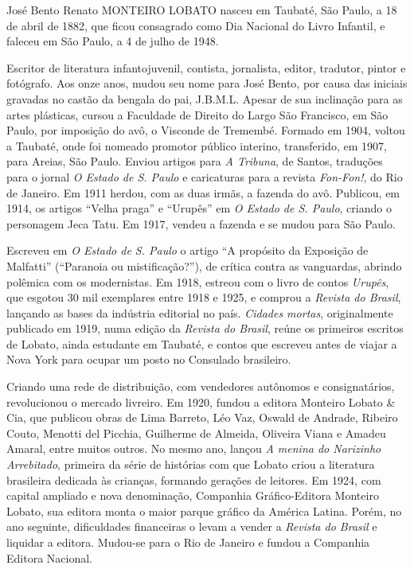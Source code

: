 \documentclass[11pt]{extarticle}
\begin{document}
José Bento Renato MONTEIRO LOBATO nasceu em Taubaté, São Paulo, a 18 de
abril de 1882, que ficou consagrado como Dia Nacional do Livro Infantil,
e faleceu em São Paulo, a 4 de julho de 1948.

Escritor de literatura infantojuvenil, contista, jornalista, editor,
tradutor, pintor e fotógrafo. Aos onze anos, mudou seu nome para José
Bento, por causa das iniciais gravadas no castão da bengala do pai,
J.B.M.L. Apesar de sua inclinação para as artes plásticas, cursou a
Faculdade de Direito do Largo São Francisco, em São Paulo, por imposição
do avô, o Visconde de Tremembé. Formado em 1904, voltou a Taubaté, onde
foi nomeado promotor público interino, transferido, em 1907, para
Areias, São Paulo. Enviou artigos para \emph{A Tribuna}, de Santos,
traduções para o jornal \emph{O Estado de S. Paulo} e caricaturas para a
revista \emph{Fon-Fon!}, do Rio de Janeiro. Em 1911 herdou, com as duas
irmãs, a fazenda do avô. Publicou, em 1914, os artigos ``Velha praga'' e
``Urupês'' em \emph{O Estado de S. Paulo}, criando o personagem Jeca
Tatu. Em 1917, vendeu a fazenda e se mudou para São Paulo.

Escreveu em \emph{O Estado de S. Paulo} o artigo ``A propósito da
Exposição de Malfatti'' (``Paranoia ou mistificação?''), de crítica
contra as vanguardas, abrindo polêmica com os modernistas. Em 1918,
estreou com o livro de contos \emph{Urupês}, que esgotou 30 mil
exemplares entre 1918 e 1925, e comprou a \emph{Revista do Brasil},
lançando as bases da indústria editorial no país. \emph{Cidades mortas},
originalmente publicado em 1919, numa edição da \emph{Revista do
Brasil}, reúne os primeiros escritos de Lobato, ainda estudante em
Taubaté, e contos que escreveu antes de viajar a Nova York para ocupar
um posto no Consulado brasileiro.

Criando uma rede de distribuição, com vendedores autônomos e
consignatários, revolucionou o mercado livreiro. Em 1920, fundou a
editora Monteiro Lobato \& Cia, que publicou obras de Lima Barreto, Léo
Vaz, Oswald de Andrade, Ribeiro Couto, Menotti del Picchia, Guilherme de
Almeida, Oliveira Viana e Amadeu Amaral, entre muitos outros. No mesmo
ano, lançou \emph{A menina do Narizinho Arrebitado}, primeira da série
de histórias com que Lobato criou a literatura brasileira dedicada às
crianças, formando gerações de leitores. Em 1924, com capital ampliado e
nova denominação, Companhia Gráfico-Editora Monteiro Lobato, sua editora
monta o maior parque gráfico da América Latina. Porém, no ano seguinte,
dificuldades financeiras o levam a vender a \emph{Revista do Brasil} e
liquidar a editora. Mudou-se para o Rio de Janeiro e fundou a Companhia
Editora Nacional.
\end{document}
